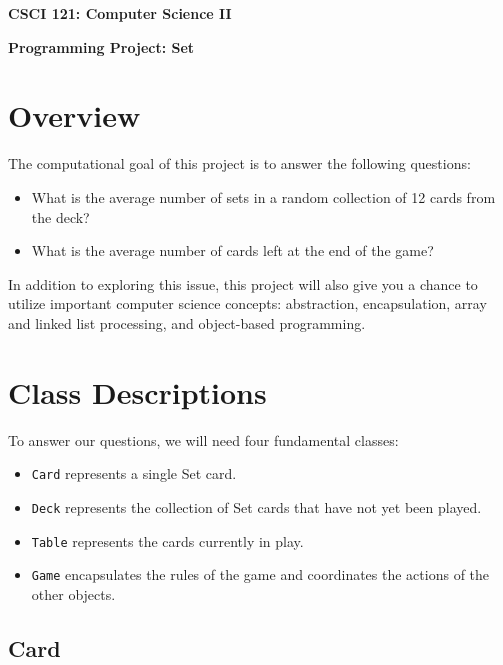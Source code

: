 \documentclass[11pt]{article}
\begin{document}
\centerline{\Large\bf CSCI 121: Computer Science II}

\vspace{.1in}

\centerline{\large\bf Programming Project: Set}

\vspace{.25in}

\section*{Overview}

The computational goal of this project is to answer the following questions:

\begin{itemize}
\item What is the average number of sets in a random collection of 12 cards
  from the deck?
\item What is the average number of cards left at the end of the game?
\end{itemize}

In addition to exploring this issue, this project will also give you a chance
to utilize important computer science concepts: abstraction, encapsulation,
array and linked list processing, and object-based programming.

\section*{Class Descriptions}

To answer our questions, we will need four fundamental classes:

\begin{itemize}
\item {\tt Card} represents a single Set card.
\item {\tt Deck} represents the collection of Set cards that have not yet been
  played.
\item {\tt Table} represents the cards currently in play.
\item {\tt Game} encapsulates the rules of the game and coordinates the actions
  of the other objects.
\end{itemize}

\subsection*{Card}
\end{document}
